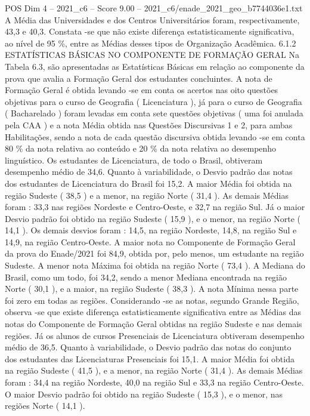\begin{textsample}{POS Dim 4 – 2021\_c6 – Score 9.00 – 2021\_c6/enade\_2021\_geo\_b7744036e1.txt}
A Média das Universidades e dos Centros Universitários foram, respectivamente, 43,3 e 40,3.
Constata -se que não existe diferença estatisticamente significativa, ao nível de 95 \%, entre as Médias desses tipos de Organização Acadêmica. 6.1.2 ESTATÍSTICAS BÁSICAS NO COMPONENTE DE FORMAÇÃO GERAL Na Tabela 6.3, são apresentadas as Estatísticas Básicas em relação ao componente da prova que avalia a Formação Geral dos estudantes concluintes.
A nota de Formação Geral é obtida levando -se em conta os acertos nas oito questões objetivas para o curso de Geografia ( Licenciatura ), já para o curso de Geografia ( Bacharelado ) foram levadas em conta sete questões objetivas ( uma foi anulada pela CAA ) e a nota Média obtida nas Questões Discursivas 1 e 2, para ambas Habilitações, sendo a nota de cada questão discursiva obtida levando -se em conta 80 \% da nota relativa ao conteúdo e 20 \% da nota relativa ao desempenho linguístico.
Os estudantes de Licenciatura, de todo o Brasil, obtiveram desempenho médio de 34,6.
Quanto à variabilidade, o Desvio padrão das notas dos estudantes de Licenciatura do Brasil foi 15,2.
A maior Média foi obtida na região Sudeste ( 38,5 ) e a menor, na região Norte ( 31,4 ).
As demais Médias foram : 33,3 nas regiões Nordeste e Centro-Oeste, e 32,7 na região Sul.
Já o maior Desvio padrão foi obtido na região Sudeste ( 15,9 ), e o menor, na região Norte ( 14,1 ).
Os demais desvios foram : 14,5, na região Nordeste, 14,8, na região Sul e 14,9, na região Centro-Oeste.
A maior nota no Componente de Formação Geral da prova do Enade/2021 foi 84,9, obtida por, pelo menos, um estudante na região Sudeste.
A menor nota Máxima foi obtida na região Norte ( 73,4 ).
A Mediana do Brasil, como um todo, foi 34,2, sendo a menor Mediana encontrada na região Norte ( 30,1 ), e a maior, na região Sudeste ( 38,3 ).
A nota Mínima nessa parte foi zero em todas as regiões.
Considerando -se as notas, segundo Grande Região, observa -se que existe diferença estatisticamente significativa entre as Médias das notas do Componente de Formação Geral obtidas na região Sudeste e nas demais regiões.
Já os alunos de cursos Presenciais de Licenciatura obtiveram desempenho médio de 36,5.
Quanto à variabilidade, o Desvio padrão das notas do conjunto dos estudantes das Licenciaturas Presenciais foi 15,1.
A maior Média foi obtida na região Sudeste ( 41,5 ), e a menor, na região Norte ( 31,4 ).
As demais Médias foram : 34,4 na região Nordeste, 40,0 na região Sul e 33,3 na região Centro-Oeste.
O maior Desvio padrão foi obtido na região Sudeste ( 15,3 ), e o menor, nas regiões Norte ( 14,1 ).

\end{textsample}
